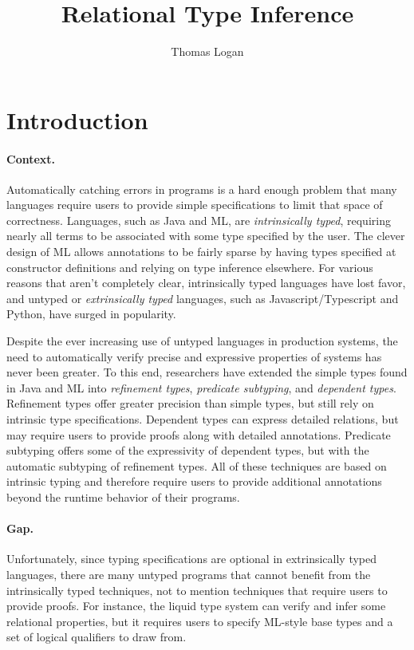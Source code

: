 \documentclass[acmsmall]{acmart}
\title{Relational Type Inference}
\author{Thomas Logan}
\begin{document}
\maketitle


\section{Introduction}

\paragraph{Context.} 
Automatically catching errors in programs is a hard enough problem
that many languages require users to provide simple specifications to limit that space of correctness.
Languages, such as Java and ML, are \textit{intrinsically typed}, 
requiring nearly all terms to be associated with some type specified by the user. 
The clever design of ML allows annotations to be fairly sparse by 
having types specified at constructor definitions and relying on type inference elsewhere.
For various reasons that aren't completely clear, intrinsically typed languages have lost favor,
and untyped or \textit{extrinsically typed} languages, 
such as Javascript/Typescript and Python, have surged in popularity. 

Despite the ever increasing use of untyped languages in production systems, 
the need to automatically verify precise and expressive properties of systems has never been greater.
To this end, researchers have extended the simple types found in Java and ML into 
\textit{refinement types}, \textit{predicate subtyping}, and \textit{dependent types}. 
Refinement types offer greater precision than simple types, but still rely on intrinsic type specifications.
Dependent types can express detailed relations, but may require users to provide proofs along with detailed annotations.
Predicate subtyping offers some of the expressivity of dependent types, but with the automatic subtyping of refinement types.
All of these techniques are based on intrinsic typing and therefore require users to provide additional annotations
beyond the runtime behavior of their programs.

\paragraph{Gap.} 
Unfortunately, since typing specifications are optional in extrinsically typed languages,
there are many untyped programs that cannot benefit from the intrinsically typed techniques,
not to mention techniques that require users to provide proofs.
For instance, the liquid type system \cite{} can verify and infer some relational properties, 
but it requires users to specify ML-style base types and a set of logical qualifiers to draw from.
\end{document}
